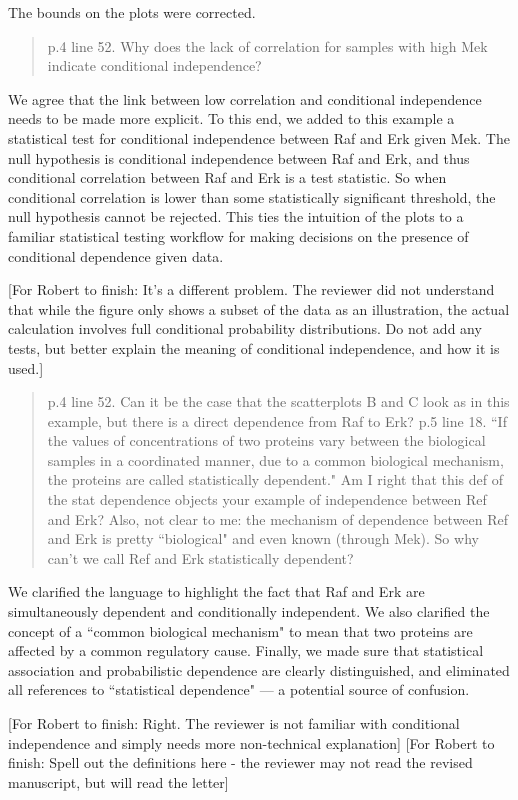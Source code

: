 \documentclass{letter}[11]
\def\todo#1{{\color{red}[For Robert to finish: #1]}}
\def\r#1{{\begin{quote}\textsf{\color{blue} #1}\end{quote}}}
\begin{document}
The bounds on the plots were corrected.

\r{p.4 line 52. Why does the lack of correlation for samples with high Mek indicate conditional independence?}

We agree that the link between low correlation and conditional independence needs to be made more explicit.  To this end, we added to this example a statistical test for conditional independence between Raf and Erk given Mek.  The null hypothesis is conditional independence between Raf and Erk, and thus conditional correlation between Raf and Erk is a test statistic.  So when conditional correlation is lower than some statistically significant threshold, the null hypothesis cannot be rejected.  This ties the  intuition of the plots to a familiar statistical testing workflow for making decisions on the presence of conditional dependence given data.  

\todo{It's a different problem. The reviewer did not understand that while the figure only shows a subset of the data as an illustration, the actual calculation involves full conditional probability distributions. Do not add any tests, but better explain the meaning of conditional independence, and how it is used.}

\r{p.4 line 52. Can it be the case that the scatterplots B and C look as in this example, but there is a direct dependence from Raf to Erk?  p.5 line 18. ``If the values of concentrations of two proteins vary between the biological samples in a coordinated manner, due to a common biological mechanism, the proteins are called statistically dependent."  Am I right that this def of the stat dependence objects your example of independence between Ref and Erk? Also, not clear to me: the mechanism of dependence between Ref and Erk is pretty ``biological" and even known (through Mek). So why can't we call Ref and Erk statistically dependent?} 

We clarified the language to highlight the fact that Raf and Erk are simultaneously dependent and conditionally independent.  We also clarified the concept of a ``common biological mechanism" to mean that two proteins are affected by a common regulatory cause.  Finally, we made sure that statistical association and probabilistic dependence are clearly distinguished, and eliminated all references to ``statistical dependence" --- a potential source of confusion.

\todo{Right. The reviewer is not familiar with conditional independence and simply needs more non-technical explanation}
\todo{Spell out the definitions here - the reviewer may not read the revised manuscript, but will read the letter}
\end{document}
